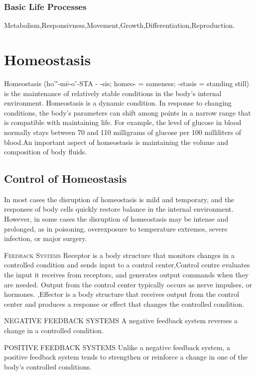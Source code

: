 \documentclass[11pt]{article}
\begin{document}
\subsubsection{Basic Life Processes}

Metabolism,Responsivness,Movement,Growth,Differentiation,Reproduction.
\section{Homeostasis}

Homeostasis (hoˉ′-mē-oˉ-STA - -sis; homeo- = sameness; -stasis = standing
still) is the maintenance of relatively stable conditions in the
body’s internal environment.  Homeostasis is a dynamic
condition. In response to changing conditions, the body’s parameters
can shift among points in a narrow range that is compatible with
maintaining life. For example, the level of glucose in blood normally
stays between 70 and 110 milligrams of glucose per 100 milliliters of
blood.An important aspect of homeostasis is maintaining the volume and
composition of body fluids.
\subsection{Control of Homeostasis}

In most cases the disruption of
homeostasis is mild and temporary, and the responses of body cells
quickly restore balance in the internal environment. However, in
some cases the disruption of homeostasis may be intense and prolonged,
as in poisoning, overexposure to temperature extremes,
severe infection, or major surgery.


\textsc{Feedback Systems}
Receptor is a body structure that monitors changes in a controlled
condition and sends input to a control center,Control centre evaluates the input it receives from receptors, and
generates output commands when they are needed. Output from
the control center typically occurs as nerve impulses, or hormones. ,Effector is a body structure that receives output
from the control center and produces a response or effect that
changes the controlled condition.


\item \textsc{NEGATIVE FEEDBACK SYSTEMS}
A negative feedback system reverses a change in a controlled condition.\item \textsc{POSITIVE FEEDBACK SYSTEMS}
Unlike a negative feedback system, a
positive feedback system tends to strengthen or reinforce a change
in one of the body’s controlled conditions.
\end{document}
